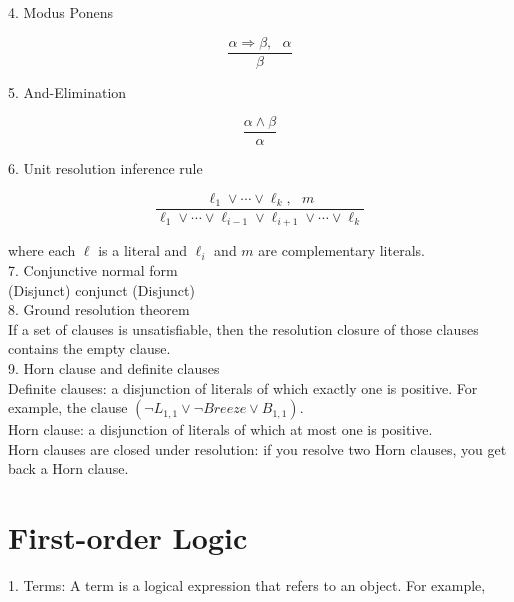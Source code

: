 \documentclass[12pt]{article}
\begin{document}
4. Modus Ponens

\begin{equation*}
  \frac {\alpha \Rightarrow \beta, \text{   } \alpha}{\beta}
\end{equation*}

5. And-Elimination

\begin{equation*}
  \frac {\alpha \land \beta}{\alpha} 
\end{equation*}

6. Unit resolution inference rule

\begin{equation*}
  \frac {\ell_1 \lor \cdots \lor \ell_k, \text{   } m}
        {\ell_1 \lor \cdots \lor \ell_{i-1} \lor \ell_{i+1} \lor \cdots \lor \ell_k}
\end{equation*}

where each $\ell$ is a literal and $\ell_i$ and $m$ are complementary literals. \\

7. Conjunctive normal form \\

(Disjunct) conjunct (Disjunct) \\

8. Ground resolution theorem \\

If a set of clauses is unsatisfiable, then the resolution closure of those clauses contains the empty clause. \\

9. Horn clause and definite clauses \\

Definite clauses: a disjunction of literals of which exactly one is positive. For example, the clause $(\lnot L_{1,1} \lor \lnot Breeze \lor B_{1,1})$. \\

Horn clause: a disjunction of literals of which at most one is positive. \\

Horn clauses are closed under resolution: if you resolve two Horn clauses, you get back a Horn clause.

\section{First-order Logic}

1. Terms: A term is a logical expression that refers to an object. For example,
\end{document}
